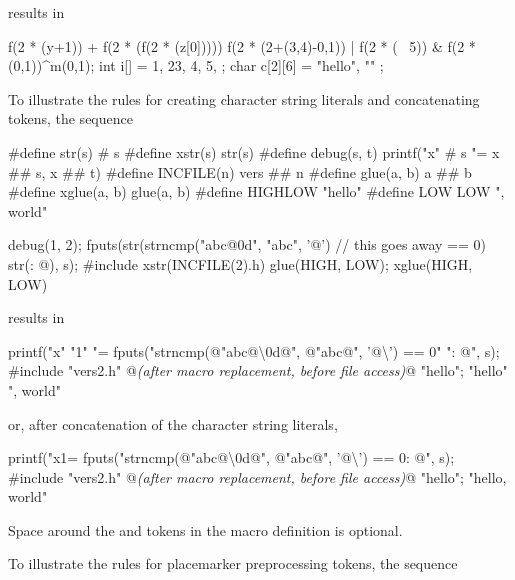 results in

\begin{codeblock}
f(2 * (y+1)) + f(2 * (f(2 * (z[0])))) %
f(2 * (2+(3,4)-0,1)) | f(2 * (~ 5)) & f(2 * (0,1))^m(0,1);
int i[] = { 1, 23, 4, 5, };
char c[2][6] = { "hello", "" };
\end{codeblock}
\exitexample

\pnum
\enterexample
To illustrate the rules for creating character string literals
and concatenating tokens,
the sequence

\begin{codeblock}
#define str(s)      # s
#define xstr(s)     str(s)
#define debug(s, t) printf("x" # s "= %
               x ## s, x ## t)
#define INCFILE(n)  vers ## n
#define glue(a, b)  a ## b
#define xglue(a, b) glue(a, b)
#define HIGHLOW     "hello"
#define LOW         LOW ", world"

debug(1, 2);
fputs(str(strncmp("abc@\textbackslash@0d", "abc", '@')  // this goes away
    == 0) str(: @\atsign\textbackslash@n), s);
#include xstr(INCFILE(2).h)
glue(HIGH, LOW);
xglue(HIGH, LOW)
\end{codeblock}

results in

\begin{codeblock}
printf("x" "1" "= %
fputs("strncmp(@\textbackslash@"abc@\textbackslash\textbackslash@0d@\textbackslash@", @\textbackslash@"abc@\textbackslash@", '@\textbackslash{}') == 0" ": @\atsign\textbackslash@n", s);
#include "vers2.h"    @\textit{(after macro replacement, before file access)}@
"hello";
"hello" ", world"
\end{codeblock}

or, after concatenation of the character string literals,

\begin{codeblock}
printf("x1= %
fputs("strncmp(@\textbackslash@"abc@\textbackslash\textbackslash@0d@\textbackslash@", @\textbackslash@"abc@\textbackslash@", '@\textbackslash{}') == 0: @\atsign\textbackslash@n", s);
#include "vers2.h"    @\textit{(after macro replacement, before file access)}@
"hello";
"hello, world"
\end{codeblock}

Space around the
\tcode{\#}
and
\tcode{\#\#}
tokens in the macro definition is optional.
\exitexample

\pnum
\enterexample
To illustrate the rules for placemarker preprocessing tokens, the sequence

